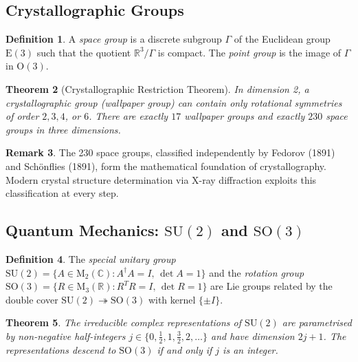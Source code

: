 \documentclass[12pt,a4paper]{amsart}
\newtheorem{theorem}{Theorem}[section]
\theoremstyle{definition}
\newtheorem{definition}[theorem]{Definition}
\newtheorem{remark}[theorem]{Remark}
\begin{document}
\subsection{Crystallographic Groups}

\begin{definition}
A \emph{space group} is a discrete subgroup $\Gamma$ of the Euclidean group
$\mathrm{E}(3)$ such that the quotient $\mathbb{R}^3/\Gamma$ is compact. The
\emph{point group} is the image of $\Gamma$ in $\mathrm{O}(3)$.
\end{definition}

\begin{theorem}[Crystallographic Restriction Theorem]
In dimension 2, a crystallographic group (wallpaper group) can contain only rotational
symmetries of order $2, 3, 4$, or $6$. There are exactly $17$ wallpaper groups and
exactly $230$ space groups in three dimensions.
\end{theorem}

\begin{remark}
The 230 space groups, classified independently by Fedorov (1891) and Sch\"{o}nflies
(1891), form the mathematical foundation of crystallography. Modern crystal structure
determination via X-ray diffraction exploits this classification at every step.
\end{remark}

\subsection{Quantum Mechanics: \texorpdfstring{$\mathrm{SU}(2)$}{SU(2)} and
            \texorpdfstring{$\mathrm{SO}(3)$}{SO(3)}}

\begin{definition}
The \emph{special unitary group}
$\mathrm{SU}(2) = \{A \in \mathrm{M}_{2}(\mathbb{C}) : A^\dagger A = I,\, \det A = 1\}$
and the \emph{rotation group}
$\mathrm{SO}(3) = \{R \in \mathrm{M}_3(\mathbb{R}) : R^T R = I,\, \det R = 1\}$
are Lie groups related by the double cover $\mathrm{SU}(2) \twoheadrightarrow \mathrm{SO}(3)$
with kernel $\{\pm I\}$.
\end{definition}

\begin{theorem}
The irreducible complex representations of $\mathrm{SU}(2)$ are parametrised by
non-negative half-integers $j \in \{0, \frac{1}{2}, 1, \frac{3}{2}, 2, \ldots\}$
and have dimension $2j+1$. The representations descend to $\mathrm{SO}(3)$ if and only
if $j$ is an integer.
\end{theorem}
\end{document}

